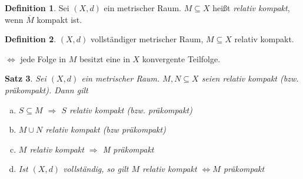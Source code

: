 \documentclass[ngerman]{report}
\theoremstyle{plain}%
\newtheorem{thm}{Satz}[chapter]
\theoremstyle{definition}%
\newtheorem{definition}[thm]{Definition}
\theoremstyle{myStyle}
\newcommand{\df}[1][]{%
	\overset{#1}{\Rightarrow}
}
\begin{document}
	\begin{definition}
		Sei $(X,d)$ ein metrischer Raum. $M\subseteq X$ heißt \textit{relativ kompakt}, wenn $\overline{M}$ kompakt ist.
	\end{definition}

	\begin{definition}
		$(X,d)$ vollständiger metrischer Raum, $M \subseteq X$ relativ kompakt. \par
{}
			$\Leftrightarrow$ jede Folge in $M$ besitzt eine in $X$ konvergente Teilfolge.
	\end{definition}

	\begin{thm}
		Sei $(X,d)$ ein metrischer Raum. $M,N \subseteq X$ seien relativ kompakt (bzw. präkompakt). Dann gilt 
			\begin{enumerate} [(a)]
				\item $S\subseteq M$ $\df$ $S$ relativ kompakt (bzw. präkompakt)
				\item $M\cup N$ relativ kompakt (bzw präkompakt)
				\item $M$ relativ kompakt $\df$ M präkompakt
				\item Ist $(X,d)$ vollständig, so gilt $M$ relativ kompakt $\Leftrightarrow M$ präkompakt
			\end{enumerate}
	\end{thm}
\end{document}
